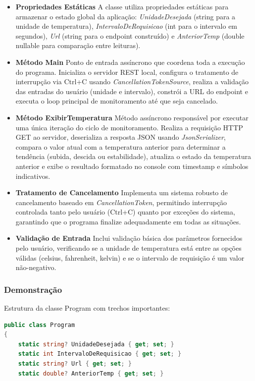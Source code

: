 \documentclass[
	12pt,				%
	oneside,			%
	a4paper,			%
	english,			%
	brazil,				%
	]{abntex2}
\begin{document}
{\begin{itemize}
    \item \textbf{Propriedades Estáticas}
    A classe utiliza propriedades estáticas para armazenar o estado global da aplicação: \textit{UnidadeDesejada} (string para a unidade de temperatura), \textit{IntervaloDeRequisicao} (int para o intervalo em segundos), \textit{Url} (string para o endpoint construído) e \textit{AnteriorTemp} (double nullable para comparação entre leituras).
    
    \item \textbf{Método Main}
    Ponto de entrada assíncrono que coordena toda a execução do programa. Inicializa o servidor REST local, configura o tratamento de interrupção via Ctrl+C usando \textit{CancellationTokenSource}, realiza a validação das entradas do usuário (unidade e intervalo), constrói a URL do endpoint e executa o loop principal de monitoramento até que seja cancelado.
    
    \item \textbf{Método ExibirTemperatura}
    Método assíncrono responsável por executar uma única iteração do ciclo de monitoramento. Realiza a requisição HTTP GET ao servidor, deserializa a resposta JSON usando \textit{JsonSerializer}, compara o valor atual com a temperatura anterior para determinar a tendência (subida, descida ou estabilidade), atualiza o estado da temperatura anterior e exibe o resultado formatado no console com timestamp e símbolos indicativos.
    
    \item \textbf{Tratamento de Cancelamento}
    Implementa um sistema robusto de cancelamento baseado em \textit{CancellationToken}, permitindo interrupção controlada tanto pelo usuário (Ctrl+C) quanto por exceções do sistema, garantindo que o programa finalize adequadamente em todas as situações.
    
    \item \textbf{Validação de Entrada}
    Inclui validação básica dos parâmetros fornecidos pelo usuário, verificando se a unidade de temperatura está entre as opções válidas (celsius, fahrenheit, kelvin) e se o intervalo de requisição é um valor não-negativo.
\end{itemize}

\subsubsection{Demonstração}
Estrutura da classe Program com trechos importantes:
\begin{lstlisting}[language=csharp]
public class Program
{
    static string? UnidadeDesejada { get; set; }
    static int IntervaloDeRequisicao { get; set; }
    static string? Url { get; set; }
    static double? AnteriorTemp { get; set; }
    

\end{lstlisting}}
\end{document}
